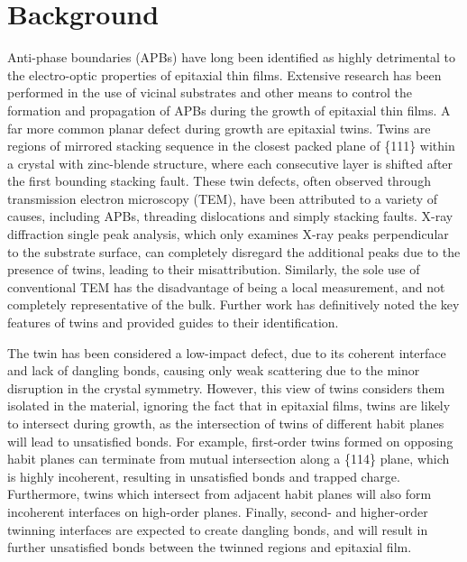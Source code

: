 \section{Background}
Anti-phase boundaries (APBs) have long been identified as highly detrimental to the electro-optic properties of epitaxial thin films\cite{Holt1969a}. Extensive research has been performed in the use of vicinal substrates and other means\cite{Kroemer1987} to control the formation and propagation of APBs during the growth of epitaxial thin films. A far more common planar defect during growth are epitaxial twins\cite{Ernst1989}. Twins are regions of mirrored stacking sequence in the closest packed plane of \{111\} within a crystal with zinc-blende structure, where each consecutive layer is shifted after the first bounding stacking fault\cite{Wagner1966}. These twin defects, often observed through transmission electron microscopy (TEM), have been attributed to a variety of causes, including APBs, threading dislocations and simply stacking faults\cite{Toyota2008b,Kim2006a,Xu2009,Proessdorf2010,Fischer1986a,Nguyen2004,Noge1987,Vila1995,Fischer1986}. X-ray diffraction single peak analysis, which only examines X-ray peaks perpendicular to the substrate surface, can completely disregard the additional peaks due to the presence of twins, leading to their misattribution. Similarly, the sole use of conventional TEM has the disadvantage of being a local measurement, and not completely representative of the bulk. Further work has definitively noted the key features of twins and provided guides to their identification\cite{Ernst1989}.

The twin has been considered a low-impact defect, due to its coherent interface and lack of dangling bonds, causing only weak scattering due to the minor disruption in the crystal symmetry. However, this view of twins considers them isolated in the material, ignoring the fact that in epitaxial films, twins are likely to intersect during growth, as the intersection of twins of different habit planes will lead to unsatisfied bonds. For example, first-order twins formed on opposing habit planes can terminate from mutual intersection along a \{114\} plane, which is highly incoherent, resulting in unsatisfied bonds and trapped charge\cite{HORNSTRA1959}. Furthermore, twins which intersect from adjacent habit planes will also form incoherent interfaces on high-order planes. Finally, second- and higher-order twinning interfaces are expected to create dangling bonds, and will result in further unsatisfied bonds between the twinned regions and epitaxial film.

